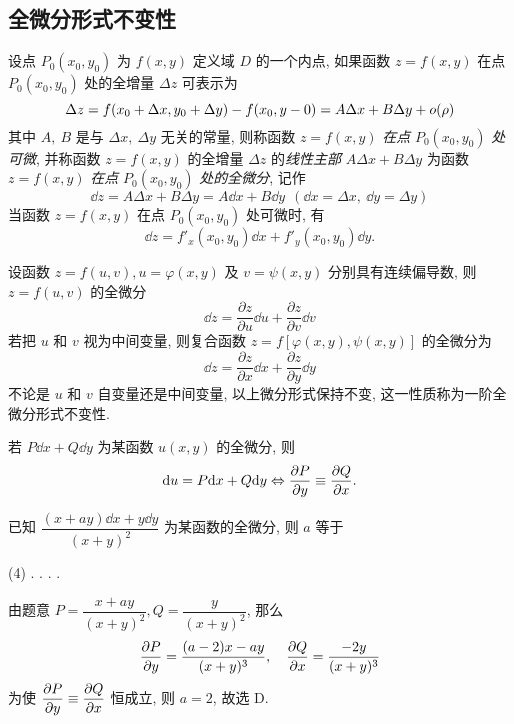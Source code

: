 \subsection{全微分形式不变性}

\begin{definition}[全微分的定义]
    设点 $P_0(x_0,y_0)$ 为 $f(x,y)$ 定义域 $D$ 的一个内点, 如果函数 $z=f(x,y)$ 在点 $P_0(x_0,y_0)$ 处的全增量 $\Delta z$ 可表示为
    $$\Delta z=f(x_0+\Delta x,y_0+\Delta y)-f(x_0,y-0)=A\Delta x+B\Delta y+o\qty(\rho)$$
    其中 $A,~B$ 是与 $\Delta x,~\Delta y$ 无关的常量, 则称函数 $z=f(x,y)$ \textit{在点} $P_0(x_0,y_0)$ \textit{处可微}, 并称函数
    $z=f(x,y)$ 的全增量 $\Delta z$ 的\textit{线性主部} $A\Delta x+B\Delta y$ 为函数 $z=f(x,y)$ \textit{在点} $P_0(x_0,y_0)$ \textit{处的全微分}, 记作
    $$\dd z=A\Delta x+B\Delta y=A\dd x+B\dd y~~(\dd x=\Delta x,~\dd y=\Delta y)$$
    当函数 $z=f(x,y)$ 在点 $P_0(x_0,y_0)$ 处可微时, 有 $$\dd z=f'_x(x_0,y_0)\dd x+f'_y(x_0,y_0)\dd y.$$
\end{definition}

\begin{theorem}[全微分的形式不变性]
    设函数 $ z=f(u, v), u=\varphi(x, y) $ 及 $ v=\psi(x, y) $ 分别具有连续偏导数, 则 $ z=f(u, v) $ 的全微分
    $$\dd  z=\frac{\partial z}{\partial u} \dd  u+\frac{\partial z}{\partial v} \dd  v$$
    若把 $ u $ 和 $ v $ 视为中间变量, 则复合函数 $ z=f[\varphi(x, y), \psi(x, y)] $ 的全微分为
    $$\dd  z=\frac{\partial z}{\partial x} \dd  x+\frac{\partial z}{\partial y} \dd  y$$
    不论是 $ u $ 和 $ v $ 自变量还是中间变量, 以上微分形式保持不变, 这一性质称为一阶全微分形式不变性.
\end{theorem}

\begin{theorem}
    若 $P \dd x+Q \dd y$ 为某函数 $u(x,y)$ 的全微分, 则 
    $$
    \dd u= P\dd x+Q\dd y\Leftrightarrow \pdv{P}{y}\equiv\pdv{Q}{x}.
    $$
\end{theorem}

\begin{example}
    已知 $\dfrac{(x+ay)\dd x+y\dd y}{(x+y)^2}$ 为某函数的全微分, 则 $a$ 等于 
    \begin{tasks}(4)
        .
        .
        .
        .
    \end{tasks}
\end{example}
\begin{solution}
    由题意 $P=\dfrac{x+ay}{(x+y)^2},Q=\dfrac{y}{(x+y)^2}$, 那么 $$
    \pdv{P}{y}=\dfrac{(a-2)x-ay}{(x+y)^3},\quad \pdv{Q}{x}=\dfrac{-2y}{(x+y)^3}
    $$
    为使 $ \displaystyle \pdv{P}{y}\equiv\pdv{Q}{x} $ 恒成立, 则 $a=2$, 故选 D.
\end{solution}

